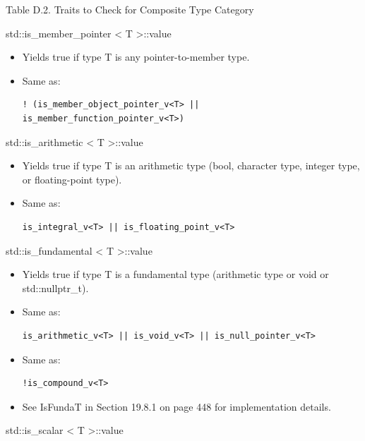 \begin{center}
Table D.2. Traits to Check for Composite Type Category
\end{center}

std::is\_member\_pointer < T >::value

\begin{itemize}
\item 
Yields true if type T is any pointer-to-member type.

\item 
Same as: 
\begin{lstlisting}[style=styleCXX]
! (is_member_object_pointer_v<T> || is_member_function_pointer_v<T>)
\end{lstlisting}
\end{itemize}

std::is\_arithmetic < T >::value

\begin{itemize}
\item 
Yields true if type T is an arithmetic type (bool, character type, integer type, or floating-point type).

\item 
Same as: 
\begin{lstlisting}[style=styleCXX]
is_integral_v<T> || is_floating_point_v<T>
\end{lstlisting}
\end{itemize}

std::is\_fundamental < T >::value

\begin{itemize}
\item 
Yields true if type T is a fundamental type (arithmetic type or void or std::nullptr\_t).

\item 
Same as: 
\begin{lstlisting}[style=styleCXX]
is_arithmetic_v<T> || is_void_v<T> || is_null_pointer_v<T>
\end{lstlisting}

\item 
Same as: 
\begin{lstlisting}[style=styleCXX]
!is_compound_v<T>
\end{lstlisting}

\item 
See IsFundaT in Section 19.8.1 on page 448 for implementation details.
\end{itemize}


std::is\_scalar < T >::value

